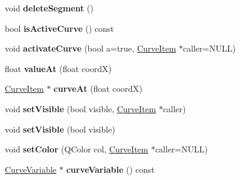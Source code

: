 \begin{DoxyCompactItemize}
\item 
\hypertarget{class_curve_item_a5405a3758f07e1e603bcfbe83ed005cc}{
void {\bfseries delete\-Segment} ()}
\label{class_curve_item_a5405a3758f07e1e603bcfbe83ed005cc}

\item 
\hypertarget{class_curve_item_ab43cebda5672404d0c5f4a711c579900}{
bool {\bfseries is\-Active\-Curve} () const }
\label{class_curve_item_ab43cebda5672404d0c5f4a711c579900}

\item 
\hypertarget{class_curve_item_a544beb99f7076029a851ed078dc850c6}{
void {\bfseries activate\-Curve} (bool a=true, \hyperlink{class_curve_item}{\-Curve\-Item} $\ast$caller=\-N\-U\-L\-L)}
\label{class_curve_item_a544beb99f7076029a851ed078dc850c6}

\item 
\hypertarget{class_curve_item_a42bed54782a7f9fa35f49388f585df90}{
float {\bfseries value\-At} (float coord\-X)}
\label{class_curve_item_a42bed54782a7f9fa35f49388f585df90}

\item 
\hypertarget{class_curve_item_a3dbd9bcf40c4e2ba9de3fb1ace152e17}{
\hyperlink{class_curve_item}{\-Curve\-Item} $\ast$ {\bfseries curve\-At} (float coord\-X)}
\label{class_curve_item_a3dbd9bcf40c4e2ba9de3fb1ace152e17}

\item 
\hypertarget{class_curve_item_a73e4c6ec81e60870b0a8bc04c45ad26a}{
void {\bfseries set\-Visible} (bool visible, \hyperlink{class_curve_item}{\-Curve\-Item} $\ast$caller)}
\label{class_curve_item_a73e4c6ec81e60870b0a8bc04c45ad26a}

\item 
\hypertarget{class_curve_item_a7e905d23afdd1de68a6dd3f0b0d497d6}{
void {\bfseries set\-Visible} (bool visible)}
\label{class_curve_item_a7e905d23afdd1de68a6dd3f0b0d497d6}

\item 
\hypertarget{class_curve_item_a8103b82a274a0ba6176d5b343c910595}{
void {\bfseries set\-Color} (\-Q\-Color col, \hyperlink{class_curve_item}{\-Curve\-Item} $\ast$caller=\-N\-U\-L\-L)}
\label{class_curve_item_a8103b82a274a0ba6176d5b343c910595}

\item 
\hypertarget{class_curve_item_a42c1c3d20fa9c2a1ef6b790dc53b0d89}{
\hyperlink{class_curve_variable}{\-Curve\-Variable} $\ast$ {\bfseries curve\-Variable} () const }
\label{class_curve_item_a42c1c3d20fa9c2a1ef6b790dc53b0d89}


\end{DoxyCompactItemize}
